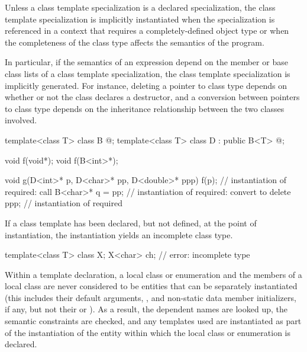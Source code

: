 \pnum
{}%
Unless a class template specialization is a declared specialization,
the class template specialization is implicitly instantiated when the
specialization is referenced in a context that requires a completely-defined
object type or when the completeness of the class type affects the semantics
of the program.
\begin{note}
In particular, if the semantics of an expression depend on the member or
base class lists of a class template specialization, the class template
specialization is implicitly generated. For instance, deleting a pointer
to class type depends on whether or not the class declares a destructor,
and a conversion between pointers to class type depends on the
inheritance relationship between the two classes involved.
\end{note}
\begin{example}
\begin{codeblock}
template<class T> class B { @\commentellip@ };
template<class T> class D : public B<T> { @\commentellip@ };

void f(void*);
void f(B<int>*);

void g(D<int>* p, D<char>* pp, D<double>* ppp) {
  f(p);             // instantiation of  required: call 
  B<char>* q = pp;  // instantiation of  required: convert  to 
  delete ppp;       // instantiation of  required
}
\end{codeblock}
\end{example}
If a class template has been declared, but not defined,
at the point of instantiation,
the instantiation yields an incomplete class type.
\begin{example}
\begin{codeblock}
template<class T> class X;
X<char> ch;         // error: incomplete type 
\end{codeblock}
\end{example}
\begin{note}
Within a template declaration,
a local class or enumeration and the members of
a local class are never considered to be entities that can be separately
instantiated (this includes their default arguments,
, and non-static data member
initializers, if any,
but not their  or ).
As a result, the dependent names are looked up, the
semantic constraints are checked, and any templates used are instantiated as
part of the instantiation of the entity within which the local class or
enumeration is declared.
\end{note}


